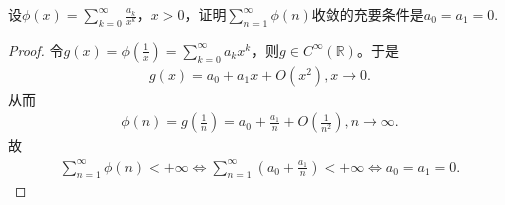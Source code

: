 \documentclass[../../main.tex]{subfiles}%
\begin{document}
\begin{example}
设\(\phi(x) = \sum_{k = 0}^{\infty} \frac{a_k}{x^k}\)，\(x > 0\)，证明\(\sum_{n = 1}^{\infty} \phi(n)\)收敛的充要条件是\(a_0 = a_1 = 0\).
\end{example}
\begin{proof}
令\(g\left( x \right) =\phi \left( \frac{1}{x} \right) =\sum_{k=0}^{\infty}{a_kx^k}\)，则\(g\in C^{\infty}\left( \mathbb{R} \right)\)。于是
\begin{align*}
g\left( x \right) =a_0+a_1x+O\left( x^2 \right) ,x\rightarrow 0.
\end{align*}
从而
\begin{align*}
\phi \left( n \right) =g\left( \frac{1}{n} \right) =a_0+\frac{a_1}{n}+O\left( \frac{1}{n^2} \right) ,n\rightarrow \infty .
\end{align*}
故
\begin{align*}
\sum_{n=1}^{\infty}{\phi \left( n \right)}<+\infty \Longleftrightarrow \sum_{n=1}^{\infty}{\left( a_0+\frac{a_1}{n} \right)}<+\infty \Longleftrightarrow a_0=a_1=0.
\end{align*}
\end{proof}
\end{document}
